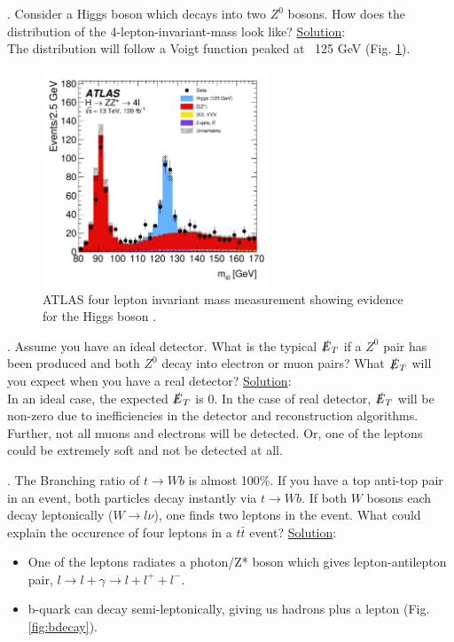 \documentclass[a4paper]{report}
\numberwithin{equation}{section}
\begin{document}
\bigbreak

. Consider a Higgs boson which decays into two $Z^0$ bosons. How does the distribution of the 4-lepton-invariant-mass look like?
\bigbreak
\noindent \underline{Solution}: \\
\noindent The distribution will follow a Voigt function peaked at ~125 GeV (Fig. \ref{fig:higgs-decay}).

\begin{figure}[htpb]
    \centering
    \includegraphics[width=0.6\textwidth]{higgs-decay}
    \caption{ATLAS four lepton invariant mass measurement showing evidence for the Higgs boson \cite{ATLAS:2020wny}.}
    \label{fig:higgs-decay}
\end{figure}

\bigbreak

. Assume you have an ideal detector. What is the typical $\slashed{E}_T$ if a $Z^0$ pair has been produced and both $Z^0$ decay into electron or muon pairs? What $\slashed{E}_T$ will you expect when you have a real detector?
\bigbreak
\noindent \underline{Solution}: \\
\noindent In an ideal case, the expected $\slashed{E}_T$ is 0. In the case of real detector, $\slashed{E}_T$ will be non-zero due to inefficiencies in the detector and reconstruction algorithms. Further, not all muons and electrons will be detected. Or, one of the leptons could be extremely soft and not be detected at all. 

\bigbreak

. The Branching ratio of $t \rightarrow W b$ is almost 100\%. If you have a top anti-top pair in an event, both particles decay instantly via $t \rightarrow W b$. If both $W$ bosons each decay leptonically ($W \rightarrow l \nu$), one finds two leptons in the event. What could explain the occurence of four leptons in a $t \bar{t}$ event?
\bigbreak
\noindent \underline{Solution}: \\
\begin{itemize}
	\item One of the leptons radiates a photon/Z* boson which gives lepton-antilepton pair, $l \rightarrow l + \gamma \rightarrow l + l^+ + l^-$.
	\item b-quark can decay semi-leptonically, giving us hadrons plus a lepton (Fig. \ref{fig:bdecay}).
\end{itemize}
\end{document}
